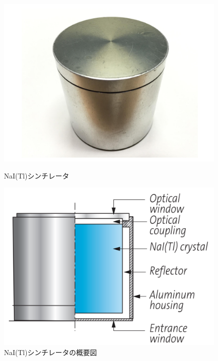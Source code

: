 \begin{figure}[htbp]
\begin{minipage}{0.5\hsize}
\centering
\includegraphics[keepaspectratio,scale=0.35]{fig/ybm/naitl.pdf}
\caption{NaI(Tl)シンチレータ}
\label{fig:naitl}
\end{minipage}
\begin{minipage}{0.5\hsize}
\centering
\includegraphics[keepaspectratio,scale=0.35]{fig/ybm/naitl0.pdf}
	\caption{NaI(Tl)シンチレータの概要図\cite{nai}}
\label{fig:naitl0}
\end{minipage}
\end{figure}

